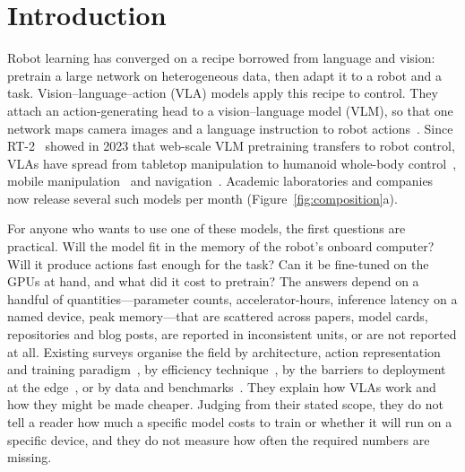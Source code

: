 \documentclass[applsci,review,submit,pdftex,oneauthor]{Definitions/mdpi}
\begin{document}
\section{Introduction}

Robot learning has converged on a recipe borrowed from language and vision: pretrain a large network on heterogeneous data, then adapt it to a robot and a task. Vision--language--action (VLA) models apply this recipe to control. They attach an action-generating head to a vision--language model (VLM), so that one network maps camera images and a language instruction to robot actions~\cite{ax230715818,ax240609246,ax241024164}. Since RT-2~\cite{ax230715818} showed in 2023 that web-scale VLM pretraining transfers to robot control, VLAs have spread from tabletop manipulation to humanoid whole-body control~\cite{ax250314734,web-figure-helix}, mobile manipulation~\cite{ax250416054,ax250313446} and navigation~\cite{ax241204453,ax241206224}. Academic laboratories and companies now release several such models per month (Figure~\ref{fig:composition}a).

For anyone who wants to use one of these models, the first questions are practical. Will the model fit in the memory of the robot's onboard computer? Will it produce actions fast enough for the task? Can it be fine-tuned on the GPUs at hand, and what did it cost to pretrain? The answers depend on a handful of quantities---parameter counts, accelerator-hours, inference latency on a named device, peak memory---that are scattered across papers, model cards, repositories and blog posts, are reported in inconsistent units, or are not reported at all. Existing surveys organise the field by architecture, action representation and training paradigm~\cite{ma2024survey,sapkota2025,zhong2025token,shao2025,kawaharazuka2025vla}, by efficiency technique~\cite{guan2025efficient,yu2025efficient}, by the barriers to deployment at the edge~\cite{grover2026edge}, or by data and benchmarks~\cite{wang2026data}. They explain how VLAs work and how they might be made cheaper. Judging from their stated scope, they do not tell a reader how much a specific model costs to train or whether it will run on a specific device, and they do not measure how often the required numbers are missing.
\end{document}
